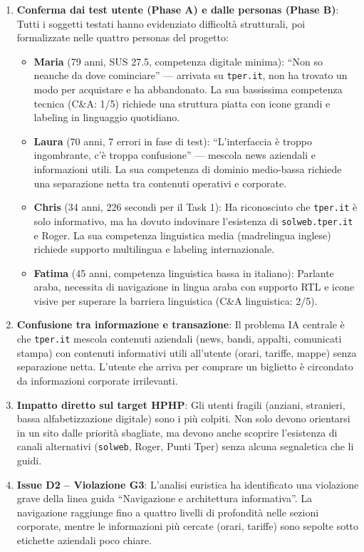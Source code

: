 \begin{tcolorbox}[colback=backgroundColor,colframe=borderColor,arc=2mm]
{\begin{enumerate}[leftmargin=*]
 \item \textbf{Conferma dai test utente (Phase A) e dalle personas (Phase B)}: Tutti i soggetti testati hanno evidenziato difficoltà strutturali, poi formalizzate nelle quattro personas del progetto:
 \begin{itemize}
   \item \textbf{Maria} (79 anni, SUS 27.5, competenza digitale minima): ``Non so neanche da dove cominciare'' --- arrivata su \texttt{tper.it}, non ha trovato un modo per acquistare e ha abbandonato. La sua bassissima competenza tecnica (C\&A: 1/5) richiede una struttura piatta con icone grandi e labeling in linguaggio quotidiano.
   \item \textbf{Laura} (70 anni, 7 errori in fase di test): ``L'interfaccia è troppo ingombrante, c'è troppa confusione'' --- mescola news aziendali e informazioni utili. La sua competenza di dominio medio-bassa richiede una separazione netta tra contenuti operativi e corporate.
   \item \textbf{Chris} (34 anni, 226 secondi per il Task 1): Ha riconosciuto che \texttt{tper.it} è solo informativo, ma ha dovuto indovinare l'esistenza di \texttt{solweb.tper.it} e Roger. La sua competenza linguistica media (madrelingua inglese) richiede supporto multilingua e labeling internazionale.
   \item \textbf{Fatima} (45 anni, competenza linguistica bassa in italiano): Parlante araba, necessita di navigazione in lingua araba con supporto RTL e icone visive per superare la barriera linguistica (C\&A linguistica: 2/5).
 \end{itemize}

 \item \textbf{Confusione tra informazione e transazione}: Il problema IA centrale è che \texttt{tper.it} mescola contenuti aziendali (news, bandi, appalti, comunicati stampa) con contenuti informativi utili all'utente (orari, tariffe, mappe) senza separazione netta. L'utente che arriva per comprare un biglietto è circondato da informazioni corporate irrilevanti.

 \item \textbf{Impatto diretto sul target HPHP}: Gli utenti fragili (anziani, stranieri, bassa alfabetizzazione digitale) sono i più colpiti. Non solo devono orientarsi in un sito dalle priorità sbagliate, ma devono anche scoprire l'esistenza di canali alternativi (\texttt{solweb}, Roger, Punti Tper) senza alcuna segnaletica che li guidi.

 \item \textbf{Issue D2 -- Violazione G3}: L'analisi euristica ha identificato una violazione grave della linea guida ``Navigazione e architettura informativa''. La navigazione raggiunge fino a quattro livelli di profondità nelle sezioni corporate, mentre le informazioni più cercate (orari, tariffe) sono sepolte sotto etichette aziendali poco chiare.
\end{enumerate}

}
\end{tcolorbox}
